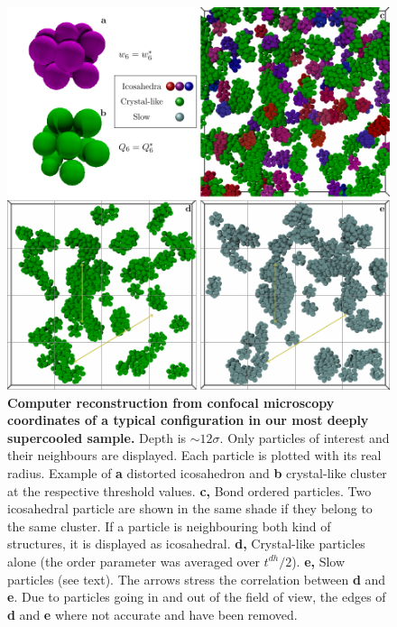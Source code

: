 \begin{figure}
\begin{center}
\includegraphics{generate_figures-figure3.pdf}
\end{center}
\caption{\textbf{Computer reconstruction from confocal microscopy coordinates of a typical configuration in our most deeply supercooled sample.} Depth is $\sim 12\sigma$. Only particles of interest and their neighbours are displayed. Each particle is plotted with its real radius.  Example of \textbf{a} distorted icosahedron and \textbf{b} crystal-like cluster at the respective threshold values. \textbf{c,} Bond ordered particles. Two icosahedral particle are shown in the same shade if they belong to the same cluster. If a particle is neighbouring both kind of structures, it is displayed as icosahedral. \textbf{d,} Crystal-like particles alone (the order parameter was averaged over $t^{dh}/2$). \textbf{e,} Slow particles (see text). The arrows stress the correlation between \textbf{d} and \textbf{e}. Due to particles going in and out of the field of view, the edges of \textbf{d} and \textbf{e} where not accurate and have been removed.}
	\label{fig:3D}
\end{figure}

